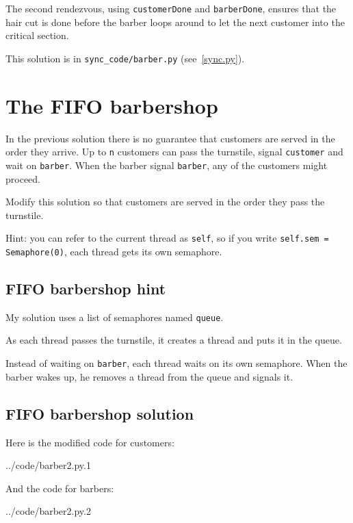 \documentclass{book}
\newcommand{\clearemptydoublepage}{\newpage\cleardoublepage}
\begin{document}
The second rendezvous, using {\tt customerDone} and {\tt barberDone},
ensures that the hair cut is done before the barber loops around to
let the next customer into the critical section.

This solution is in \verb"sync_code/barber.py" (see~\ref{sync.py}).


\clearemptydoublepage
\section{The FIFO barbershop}

In the previous solution there is no guarantee that customers are
served in the order they arrive.  Up to {\tt n} customers can pass
the turnstile, signal
{\tt customer} and wait on {\tt barber}.  When the barber signal
{\tt barber}, any of the customers might proceed.

Modify this solution so that customers are served in the order they
pass the turnstile.

Hint: you can refer to the current thread as {\tt self}, so if you
write {\tt self.sem = Semaphore(0)}, each thread gets its own
semaphore.


\clearemptydoublepage
\subsection{FIFO barbershop hint}

My solution uses a list of semaphores named {\tt queue}.



As each thread passes the turnstile, it creates a thread and puts it
in the queue.

Instead of waiting on {\tt barber}, each thread waits on its own
semaphore.  When the barber wakes up, he removes a thread from the queue and
signals it.


\clearemptydoublepage
\subsection{FIFO barbershop solution}

Here is the modified code for customers:


{../code/barber2.py.1}

And the code for barbers:


{../code/barber2.py.2}
\end{document}
